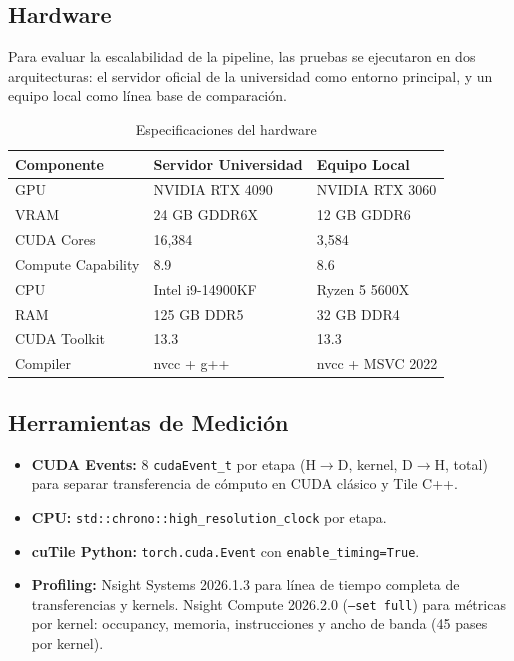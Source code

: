 \documentclass[12pt,a4paper]{article}
\begin{document}
\subsection{Hardware}

Para evaluar la escalabilidad de la pipeline, las pruebas se ejecutaron en dos arquitecturas: el servidor oficial de la universidad como entorno principal, y un equipo local como l\'inea base de comparaci\'on.

\begin{table}[H]
\centering
\caption{Especificaciones del hardware}
\begin{tabular}{lll}
\toprule
\textbf{Componente} & \textbf{Servidor Universidad} & \textbf{Equipo Local} \\
\midrule
GPU & NVIDIA RTX 4090 & NVIDIA RTX 3060 \\
VRAM & 24 GB GDDR6X & 12 GB GDDR6 \\
CUDA Cores & 16,384 & 3,584 \\
Compute Capability & 8.9 & 8.6 \\
CPU & Intel i9-14900KF & Ryzen 5 5600X \\
RAM & 125 GB DDR5 & 32 GB DDR4 \\
CUDA Toolkit & 13.3 & 13.3 \\
Compiler & nvcc + g++ & nvcc + MSVC 2022 \\
\bottomrule
\end{tabular}
\end{table}

\subsection{Herramientas de Medici\'on}

\begin{itemize}
  \item \textbf{CUDA Events:} 8 \texttt{cudaEvent\_t} por etapa (H$\rightarrow$D, kernel, D$\rightarrow$H, total) para separar transferencia de c\'omputo en CUDA cl\'asico y Tile C++.
  \item \textbf{CPU:} \texttt{std::chrono::high\_resolution\_clock} por etapa.
  \item \textbf{cuTile Python:} \texttt{torch.cuda.Event} con \texttt{enable\_timing=True}.
  \item \textbf{Profiling:} Nsight Systems 2026.1.3 para l\'inea de tiempo completa de transferencias y kernels. Nsight Compute 2026.2.0 (\texttt{--set full}) para m\'etricas por kernel: occupancy, memoria, instrucciones y ancho de banda (45 pases por kernel).
\end{itemize}
\end{document}
